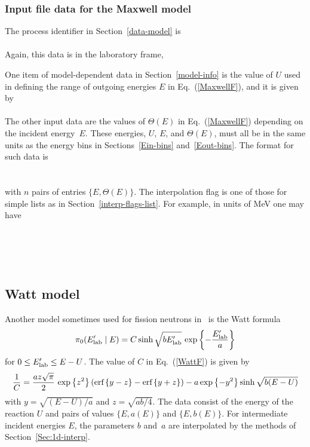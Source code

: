\subsubsection{Input file data for the Maxwell model}
The process identifier in Section~\ref{data-model} is\\
  \\
Again, this data is in the laboratory frame,\\

One item of model-dependent data in Section~\ref{model-info}
is the value of $U$ used in defining the range of outgoing
energies $E$ in Eq.~(\ref{MaxwellF}), and it is given by\\
  \\
The other input data are the values of $\Theta(E)$ in
Eq.~(\ref{MaxwellF}) depending on the incident energy~$E$.  
These energies, $U$, $E$, and $\Theta(E)$, must all be in the same
units as the energy bins in Sections~\ref{Ein-bins} and~\ref{Eout-bins}.
The format for such data is\\
  \\
  \\
with $n$ pairs of entries $\{E, \Theta(E)\}$.  
The interpolation flag is one of those for simple lists as in 
Section~\ref{interp-flags-list}.
For example, in units of MeV one may have\\
  \\
  \\
  \\
  \\

\subsection{Watt model}
Another model sometimes used for fission neutrons in \xendl\ is the Watt
formula
\begin{equation}
  \pi_0(E_{\text{lab}}'  \mid E) = C \sinh{\sqrt{bE_{\text{lab}}' }}\, \exp\left\{- \frac{E_{\text{lab}}' }{a}\right\}
 \label{WattF}
\end{equation}
for $0 \le E_{\text{lab}}'  \le E - U$.
The value of $C$ in Eq.~(\ref{WattF})
is given by
$$
  \frac{1}{C} =
  \frac{az\sqrt{\pi}}{2}\, \exp\left\{z^2\right\}
  \left(
    \text{erf}\left\{y - z\right\} - \text{erf}\left\{y + z\right\}
  \right) -
  a \exp\left\{-y^2\right\} \sinh{\sqrt{b(E - U)}}
$$
with $y = \sqrt{(E - U)/a}$ and $z = \sqrt{ab /4}$.
The data consist of the energy of the reaction $U$ and pairs of
values $\{E, a(E)\}$ and $\{E, b(E)\}$.  For intermediate incident
energies $E$, the parameters $b$ and~$a$ are interpolated by
the methods of Section~\ref{Sec:1d-interp}.

